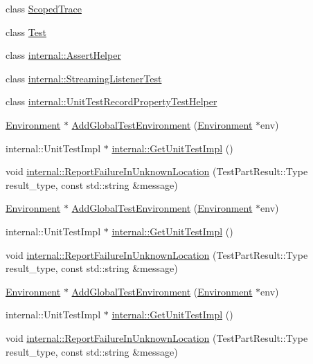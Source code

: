 \begin{DoxyCompactItemize}
\item 
class \mbox{\hyperlink{classtesting_1_1_unit_test_a65475fe54e533c6a9c44ddbc438f8fb1}{Scoped\+Trace}}
\item 
class \mbox{\hyperlink{classtesting_1_1_unit_test_ab085d1bf4cff8b1045750706b11f8662}{Test}}
\item 
class \mbox{\hyperlink{classtesting_1_1_unit_test_a7375bdc46f0244d0011c2d15ee160473}{internal\+::\+Assert\+Helper}}
\item 
class \mbox{\hyperlink{classtesting_1_1_unit_test_a2021083660b7387a257fb6c6242fee73}{internal\+::\+Streaming\+Listener\+Test}}
\item 
class \mbox{\hyperlink{classtesting_1_1_unit_test_a4eaca072927111aedfecd9787cebbbcc}{internal\+::\+Unit\+Test\+Record\+Property\+Test\+Helper}}
\item 
\mbox{\hyperlink{classtesting_1_1_environment}{Environment}} $\ast$ \mbox{\hyperlink{classtesting_1_1_unit_test_a5ec26e4c31220ff8e769cc09689a4d6d}{Add\+Global\+Test\+Environment}} (\mbox{\hyperlink{classtesting_1_1_environment}{Environment}} $\ast$env)
\item 
internal\+::\+Unit\+Test\+Impl $\ast$ \mbox{\hyperlink{classtesting_1_1_unit_test_a56e56be7066957d612e53b5c60f6ac08}{internal\+::\+Get\+Unit\+Test\+Impl}} ()
\item 
void \mbox{\hyperlink{classtesting_1_1_unit_test_a73f5a158c13793b90c80d854c9a75120}{internal\+::\+Report\+Failure\+In\+Unknown\+Location}} (Test\+Part\+Result\+::\+Type result\+\_\+type, const std\+::string \&message)
\item 
\mbox{\hyperlink{classtesting_1_1_environment}{Environment}} $\ast$ \mbox{\hyperlink{classtesting_1_1_unit_test_a5ec26e4c31220ff8e769cc09689a4d6d}{Add\+Global\+Test\+Environment}} (\mbox{\hyperlink{classtesting_1_1_environment}{Environment}} $\ast$env)
\item 
internal\+::\+Unit\+Test\+Impl $\ast$ \mbox{\hyperlink{classtesting_1_1_unit_test_a56e56be7066957d612e53b5c60f6ac08}{internal\+::\+Get\+Unit\+Test\+Impl}} ()
\item 
void \mbox{\hyperlink{classtesting_1_1_unit_test_a73f5a158c13793b90c80d854c9a75120}{internal\+::\+Report\+Failure\+In\+Unknown\+Location}} (Test\+Part\+Result\+::\+Type result\+\_\+type, const std\+::string \&message)
\item 
\mbox{\hyperlink{classtesting_1_1_environment}{Environment}} $\ast$ \mbox{\hyperlink{classtesting_1_1_unit_test_a5ec26e4c31220ff8e769cc09689a4d6d}{Add\+Global\+Test\+Environment}} (\mbox{\hyperlink{classtesting_1_1_environment}{Environment}} $\ast$env)
\item 
internal\+::\+Unit\+Test\+Impl $\ast$ \mbox{\hyperlink{classtesting_1_1_unit_test_a56e56be7066957d612e53b5c60f6ac08}{internal\+::\+Get\+Unit\+Test\+Impl}} ()
\item 
void \mbox{\hyperlink{classtesting_1_1_unit_test_a73f5a158c13793b90c80d854c9a75120}{internal\+::\+Report\+Failure\+In\+Unknown\+Location}} (Test\+Part\+Result\+::\+Type result\+\_\+type, const std\+::string \&message)
\end{DoxyCompactItemize}


